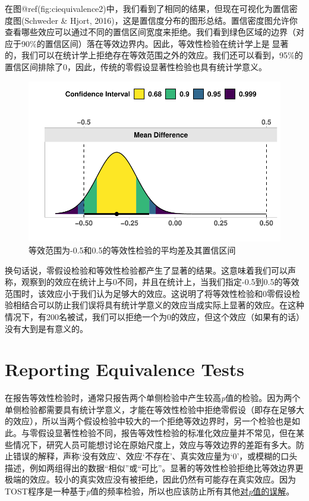 \documentclass[
  letterpaper,
  DIV=11,
  numbers=noendperiod]{scrreprt}
\begin{document}
在图@ref(fig:ciequivalence2)中，我们看到了相同的结果，但现在可视化为置信密度图(Schweder
\& Hjort,
2016)，这是置信度分布的图形总结。置信密度图允许你查看哪些效应可以通过不同的置信区间宽度来拒绝。我们看到绿色区域的边界（对应于90\%的置信区间）落在等效边界内。因此，等效性检验在统计学上是显著的，我们可以在统计学上拒绝存在等效范围之外的效应。我们还可以看到，95\%的置信区间排除了0，因此，传统的零假设显著性检验也具有统计学意义。

\begin{figure}

{\centering \includegraphics[width=1\textwidth,height=\textheight]{09-equivalencetest_files/figure-pdf/fig-ciequivalence2-1.pdf}

}

\caption{\label{fig-ciequivalence2}等效范围为-0.5和0.5的等效性检验的平均差及其置信区间}

\end{figure}

换句话说，零假设检验和等效性检验都产生了显著的结果。这意味着我们可以声称，观察到的效应在统计上与0不同，并且在统计上，当我们指定-0.5到0.5的等效范围时，该效应小于我们认为足够大的效应。这说明了将等效性检验和0零假设检验相结合可以防止我们误将具有统计学意义的效应当成实际上显著的效应。在这种情况下，有200名被试，我们可以拒绝一个为0的效应，但这个效应（如果有的话）没有大到是有意义的。

\hypertarget{reporting-equivalence-tests}{%
\section{Reporting Equivalence
Tests}\label{reporting-equivalence-tests}}

在报告等效性检验时，通常只报告两个单侧检验中产生较高\emph{p}值的检验。因为两个单侧检验都需要具有统计学意义，才能在等效性检验中拒绝零假设（即存在足够大的效应），所以当两个假设检验中较大的一个拒绝等效边界时，另一个检验也是如此。与零假设显著性检验不同，报告等效性检验的标准化效应量并不常见，但在某些情况下，研究人员可能想讨论在原始尺度上，效应与等效边界的差距有多大。防止错误的解释，声称`没有效应'、效应`不存在'、真实效应量为`0'，或模糊的口头描述，例如两组得出的数据``相似''或``可比''。显著的等效性检验拒绝比等效边界更极端的效应。较小的真实效应没有被拒绝，因此仍然有可能存在真实效应。因为TOST程序是一种基于\emph{p}值的频率检验，所以也应该防止所有其他\protect\hyperlink{misconceptions}{对\emph{p}值的误解}。
\end{document}

